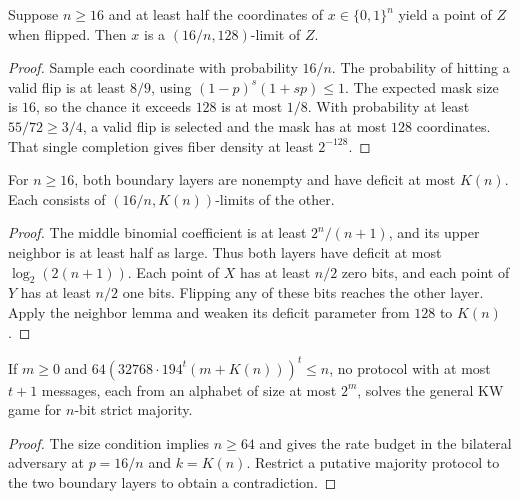 \begin{lemma}
  \label{lem:lowerbounds-neighbor-density-limit}
  \leanok
  Suppose $n\ge16$ and at least half the coordinates of $x\in\{0,1\}^n$
  yield a point of $Z$ when flipped. Then $x$ is a $(16/n,128)$-limit of $Z$.
\end{lemma}
\begin{proof}
  \leanok
  Sample each coordinate with probability $16/n$. The probability of
  hitting a valid flip is at least $8/9$, using $(1-p)^s(1+sp)\le1$.
  The expected mask size is $16$, so the chance it exceeds $128$ is at
  most $1/8$. With probability at least $55/72\ge3/4$, a valid flip is
  selected and the mask has at most $128$ coordinates. That single
  completion gives fiber density at least $2^{-128}$.
\end{proof}

\begin{lemma}
  \label{lem:lowerbounds-majority-initialization}
  \leanok
  For $n\ge16$, both boundary layers are nonempty and have deficit at most
  $K(n)$. Each consists of $(16/n,K(n))$-limits of the other.
\end{lemma}
\begin{proof}
  \leanok
  The middle binomial coefficient is at least $2^n/(n+1)$, and its upper
  neighbor is at least half as large. Thus both layers have deficit at
  most $\log_2(2(n+1))$. Each point of $X$ has at least $n/2$ zero bits,
  and each point of $Y$ has at least $n/2$ one bits. Flipping any of
  these bits reaches the other layer. Apply the neighbor lemma and
  weaken its deficit parameter from $128$ to $K(n)$.
\end{proof}

\begin{theorem}
  \label{thm:lowerbounds-majority-topdown-finite}
  \leanok
  If $m\ge0$ and
  $64(32768\cdot194^t(m+K(n)))^t\le n$, no protocol with at most $t+1$
  messages, each from an alphabet of size at most $2^m$, solves the
  general KW game for $n$-bit strict majority.
\end{theorem}
\begin{proof}
  \leanok
  The size condition implies $n\ge64$ and gives the rate budget in the
  bilateral adversary at $p=16/n$ and $k=K(n)$. Restrict a putative
  majority protocol to the two boundary layers to obtain a contradiction.
\end{proof}

